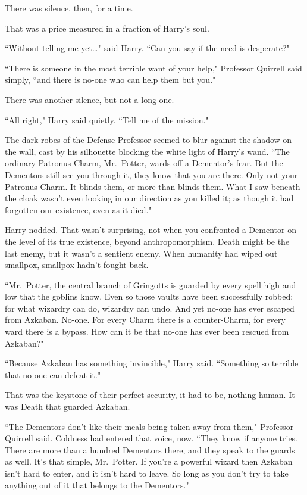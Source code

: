 There was silence, then, for a time.

That was a price measured in a fraction of Harry's soul.

``Without telling me yet{\ldots}" said Harry. ``Can you say if the need is desperate?"

``There is someone in the most terrible want of your help," Professor Quirrell said simply, ``and there is no-one who can help them but you."

There was another silence, but not a long one.

``All right," Harry said quietly. ``Tell me of the mission."

The dark robes of the Defense Professor seemed to blur against the shadow on the wall, cast by his silhouette blocking the white light of Harry's wand. ``The ordinary Patronus Charm, Mr.~Potter, wards off a Dementor's fear. But the Dementors still see you through it, they know that you are there. Only not your Patronus Charm. It blinds them, or more than blinds them. What I saw beneath the cloak wasn't even looking in our direction as you killed it; as though it had forgotten our existence, even as it died."

Harry nodded. That wasn't surprising, not when you confronted a Dementor on the level of its true existence, beyond anthropomorphism. Death might be the last enemy, but it wasn't a sentient enemy. When humanity had wiped out smallpox, smallpox hadn't fought back.

``Mr.~Potter, the central branch of Gringotts is guarded by every spell high and low that the goblins know. Even so those vaults have been successfully robbed; for what wizardry can do, wizardry can undo. And yet no-one has ever escaped from Azkaban. No-one. For every Charm there is a counter-Charm, for every ward there is a bypass. How can it be that no-one has ever been rescued from Azkaban?"

``Because Azkaban has something invincible," Harry said. ``Something so terrible that no-one can defeat it."

That was the keystone of their perfect security, it had to be, nothing human. It was Death that guarded Azkaban.

``The Dementors don't like their meals being taken away from them," Professor Quirrell said. Coldness had entered that voice, now. ``They know if anyone tries. There are more than a hundred Dementors there, and they speak to the guards as well. It's that simple, Mr.~Potter. If you're a powerful wizard then Azkaban isn't hard to enter, and it isn't hard to leave. So long as you don't try to take anything out of it that belongs to the Dementors."

